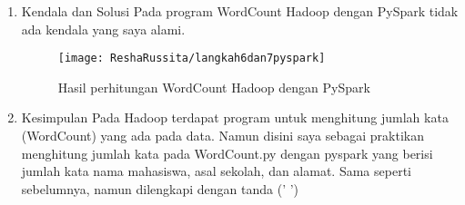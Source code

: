\begin{enumerate}
\item Kendala dan Solusi
\newline Pada program WordCount Hadoop dengan PySpark tidak ada kendala yang saya alami.

\begin{figure}[!ht]
\texttt{[image: ReshaRussita/langkah6dan7pyspark]}
\caption{Hasil perhitungan WordCount Hadoop dengan PySpark}
\label{gam:perkuliahan-22-12}
\end{figure}

\item Kesimpulan
\newline Pada Hadoop terdapat program untuk menghitung jumlah kata (WordCount) yang ada pada data. 
Namun disini saya sebagai praktikan menghitung jumlah kata pada WordCount.py dengan pyspark yang berisi jumlah kata nama mahasiswa, asal sekolah, dan alamat. Sama seperti sebelumnya, namun dilengkapi dengan tanda (' ')

\end{enumerate}

